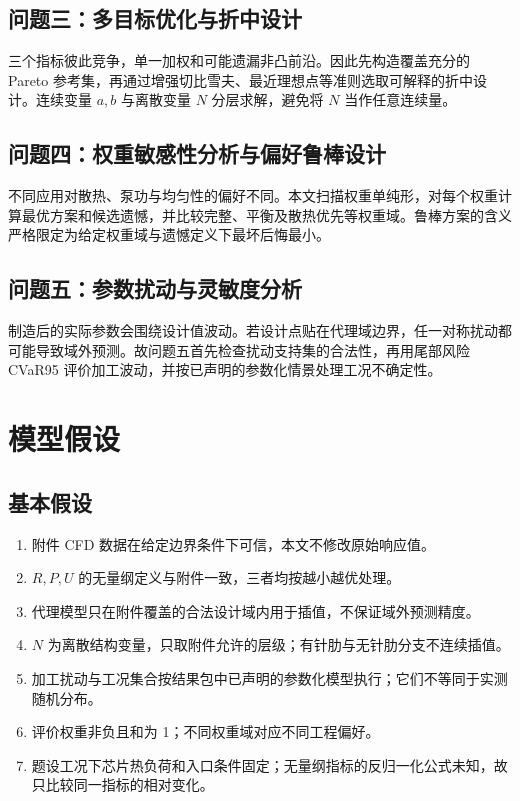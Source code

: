 \documentclass[12pt,a4paper]{article}
\begin{document}
\subsection{问题三：多目标优化与折中设计}
三个指标彼此竞争，单一加权和可能遗漏非凸前沿。因此先构造覆盖充分的 Pareto 参考集，再通过增强切比雪夫、最近理想点等准则选取可解释的折中设计。连续变量 $a,b$ 与离散变量 $N$ 分层求解，避免将 $N$ 当作任意连续量。

\subsection{问题四：权重敏感性分析与偏好鲁棒设计}
不同应用对散热、泵功与均匀性的偏好不同。本文扫描权重单纯形，对每个权重计算最优方案和候选遗憾，并比较完整、平衡及散热优先等权重域。鲁棒方案的含义严格限定为给定权重域与遗憾定义下最坏后悔最小。

\subsection{问题五：参数扰动与灵敏度分析}
制造后的实际参数会围绕设计值波动。若设计点贴在代理域边界，任一对称扰动都可能导致域外预测。故问题五首先检查扰动支持集的合法性，再用尾部风险 CVaR95 评价加工波动，并按已声明的参数化情景处理工况不确定性。

\section{模型假设}
\subsection{基本假设}
\begin{enumerate}[label=\arabic*.]
\item 附件 CFD 数据在给定边界条件下可信，本文不修改原始响应值。
\item $R,P,U$ 的无量纲定义与附件一致，三者均按越小越优处理。
\item 代理模型只在附件覆盖的合法设计域内用于插值，不保证域外预测精度。
\item $N$ 为离散结构变量，只取附件允许的层级；有针肋与无针肋分支不连续插值。
\item 加工扰动与工况集合按结果包中已声明的参数化模型执行；它们不等同于实测随机分布。
\item 评价权重非负且和为 1；不同权重域对应不同工程偏好。
\item 题设工况下芯片热负荷和入口条件固定；无量纲指标的反归一化公式未知，故只比较同一指标的相对变化。
\end{enumerate}
\end{document}
